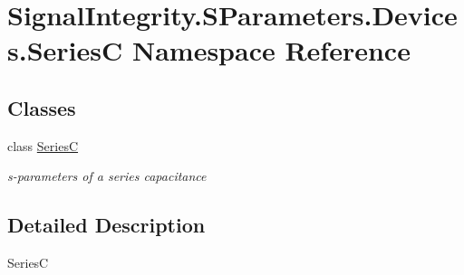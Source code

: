 \hypertarget{namespaceSignalIntegrity_1_1SParameters_1_1Devices_1_1SeriesC}{}\section{Signal\+Integrity.\+S\+Parameters.\+Devices.\+SeriesC Namespace Reference}
\label{namespaceSignalIntegrity_1_1SParameters_1_1Devices_1_1SeriesC}
\subsection*{Classes}
\begin{DoxyCompactItemize}
\item 
class \hyperlink{classSignalIntegrity_1_1SParameters_1_1Devices_1_1SeriesC_1_1SeriesC}{SeriesC}
\begin{DoxyCompactList}\small\item\em s-\/parameters of a series capacitance \end{DoxyCompactList}\end{DoxyCompactItemize}


\subsection{Detailed Description}
\begin{DoxyVerb}SeriesC\end{DoxyVerb}
 